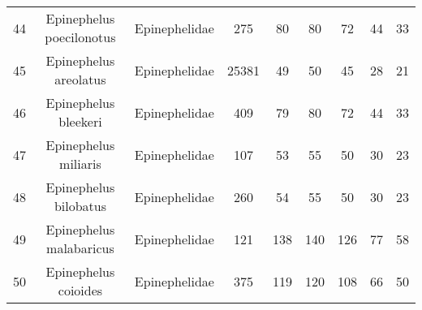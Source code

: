 \documentclass{report}\usepackage[]{graphicx}\usepackage[]{color}
\begin{document}
{\begin{longtable}{ccccccccc}
  44 & Epinephelus poecilonotus & Epinephelidae & 275 & 80 & 80 & 72 & 44 & 33 \\ 
  45 & Epinephelus areolatus & Epinephelidae & 25381 & 49 & 50 & 45 & 28 & 21 \\ 
  46 & Epinephelus bleekeri & Epinephelidae & 409 & 79 & 80 & 72 & 44 & 33 \\ 
  47 & Epinephelus miliaris & Epinephelidae & 107 & 53 & 55 & 50 & 30 & 23 \\ 
  48 & Epinephelus bilobatus & Epinephelidae & 260 & 54 & 55 & 50 & 30 & 23 \\ 
  49 & Epinephelus malabaricus & Epinephelidae & 121 & 138 & 140 & 126 & 77 & 58 \\ 
  50 & Epinephelus coioides & Epinephelidae & 375 & 119 & 120 & 108 & 66 & 50 \\ 
   \hline
\hline
\end{longtable}
}
 
\end{document}
